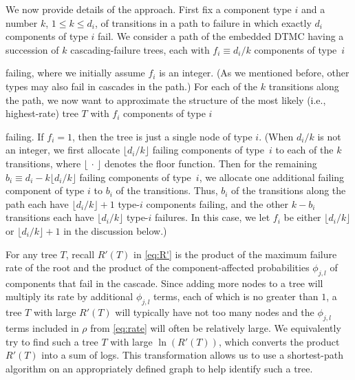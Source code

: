 \documentclass[12pt]{article}
\def\myxoutii{\bgroup \markoverwith{\textcolor{blue}{\hbox to.35em{\hss/\hss}}}\ULon}
\newcommand{\changed}[1]{#1}
\newcommand{\deletedii}[1]{}
\newcommand{\changedii}[1]{#1}
\newcommand{\changed}[1]{\textcolor{red}{#1}}
\newcommand{\changedii}[1]{\textcolor{blue}{#1}}
\newcommand{\deletedii}[1]{{\myxoutii{#1}}}
\begin{document}
\changed{We now provide details
of the approach.
First fix a component type $i$
and a number $k$,
$1 \leq k \leq d_{i}$, of transitions
in a path to failure in which exactly
$d_{i}$ components of type $i$ fail.
We consider a path of the embedded
DTMC having
a succession of $k$ cascading-failure
trees, each with $f_{i} \equiv d_{i}/k$
components of type~$i$ 
\deletedii{(and possibly other component
types)}
failing, where we initially assume
$f_i$ is an integer.
\changedii{(As we mentioned before,
other types may also fail in cascades
in the path.)}
For each of the $k$ transitions along the path,
we now want to approximate the
structure of the most likely
(i.e., highest-rate) tree $T$
with $f_{i}$ components of type $i$
\deletedii{(and possibly other component types)}
failing.
If $f_i = 1$, then the tree is just
a single node of type $i$.
(When $d_{i}/k$ is not an integer,
we first allocate $\lfloor d_{i}/k \rfloor$
failing components of type~$i$ to each
of the $k$ transitions,
where $\lfloor \, \cdot \, \rfloor$
denotes the floor function.
Then for the remaining $b_{i} \equiv
d_{i} - k \lfloor d_{i}/k \rfloor$ failing
components
of type~$i$, we allocate one
additional failing component of type $i$ to
$b_{i}$ of the transitions.
Thus, $b_i$ of the transitions
along the path each have
$\lfloor d_{i}/k \rfloor + 1$
type-$i$ components failing,
and the other $k - b_i$ transitions
each have $\lfloor d_{i}/k \rfloor$
type-$i$ failures.
In this case, we let $f_{i}$ be
either $\lfloor d_{i}/k \rfloor$
or $\lfloor d_{i}/k \rfloor + 1$
in the discussion below.)}

\changed{For any tree $T$,
recall $R'(T)$ in \eqref{eq:R'}
is the product of the
maximum failure rate of the root and the
product of the component-affected
probabilities $\phi_{j,l}$ of
components that fail in
the cascade.
Since adding more nodes to
a tree will multiply its rate
by additional $\phi_{j,l}$ terms,
each of which is no greater than $1$,
a tree $T$
with large $R'(T)$
will
typically have not too many nodes
and the $\phi_{j,l}$ terms}
included
in $\rho$ from \eqref{eq:rate} will
often be relatively large.
We equivalently try to find
such a tree $T$ with large $\ln(R'(T))$,
which converts the product $R'(T)$
into a sum of logs.
\changed{This transformation allows us to
use}
a shortest-path algorithm on
an appropriately defined graph
to help identify
such a tree.
\end{document}

